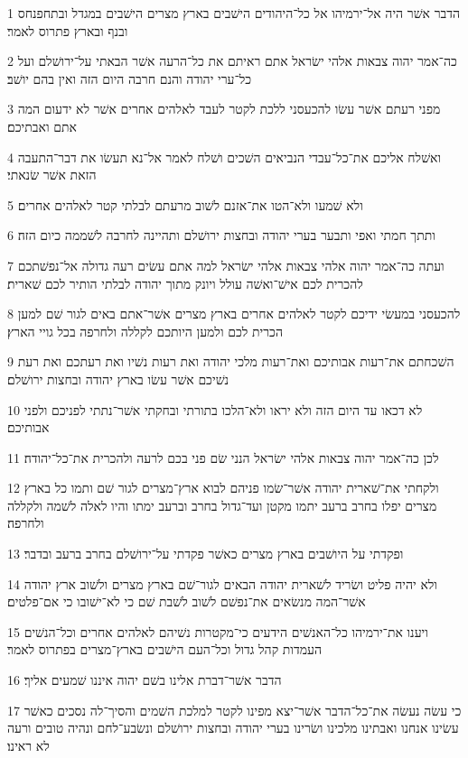 \par 1 הדבר אשׁר היה אל־ירמיהו אל כל־היהודים הישׁבים בארץ מצרים הישׁבים במגדל ובתחפנחס ובנף ובארץ פתרוס לאמר׃
\par 2 כה־אמר יהוה צבאות אלהי ישׂראל אתם ראיתם את כל־הרעה אשׁר הבאתי על־ירושׁלם ועל כל־ערי יהודה והנם חרבה היום הזה ואין בהם יושׁב׃
\par 3 מפני רעתם אשׁר עשׂו להכעסני ללכת לקטר לעבד לאלהים אחרים אשׁר לא ידעום המה אתם ואבתיכם׃
\par 4 ואשׁלח אליכם את־כל־עבדי הנביאים השׁכים ושׁלח לאמר אל־נא תעשׂו את דבר־התעבה הזאת אשׁר שׂנאתי׃
\par 5 ולא שׁמעו ולא־הטו את־אזנם לשׁוב מרעתם לבלתי קטר לאלהים אחרים׃
\par 6 ותתך חמתי ואפי ותבער בערי יהודה ובחצות ירושׁלם ותהיינה לחרבה לשׁממה כיום הזה׃
\par 7 ועתה כה־אמר יהוה אלהי צבאות אלהי ישׂראל למה אתם עשׂים רעה גדולה אל־נפשׁתכם להכרית לכם אישׁ־ואשׁה עולל ויונק מתוך יהודה לבלתי הותיר לכם שׁארית׃
\par 8 להכעסני במעשׂי ידיכם לקטר לאלהים אחרים בארץ מצרים אשׁר־אתם באים לגור שׁם למען הכרית לכם ולמען היותכם לקללה ולחרפה בכל גויי הארץ׃
\par 9 השׁכחתם את־רעות אבותיכם ואת־רעות מלכי יהודה ואת רעות נשׁיו ואת רעתכם ואת רעת נשׁיכם אשׁר עשׂו בארץ יהודה ובחצות ירושׁלם׃
\par 10 לא דכאו עד היום הזה ולא יראו ולא־הלכו בתורתי ובחקתי אשׁר־נתתי לפניכם ולפני אבותיכם׃
\par 11 לכן כה־אמר יהוה צבאות אלהי ישׂראל הנני שׂם פני בכם לרעה ולהכרית את־כל־יהודה׃
\par 12 ולקחתי את־שׁארית יהודה אשׁר־שׂמו פניהם לבוא ארץ־מצרים לגור שׁם ותמו כל בארץ מצרים יפלו בחרב ברעב יתמו מקטן ועד־גדול בחרב וברעב ימתו והיו לאלה לשׁמה ולקללה ולחרפה׃
\par 13 ופקדתי על היושׁבים בארץ מצרים כאשׁר פקדתי על־ירושׁלם בחרב ברעב ובדבר׃
\par 14 ולא יהיה פליט ושׂריד לשׁארית יהודה הבאים לגור־שׁם בארץ מצרים ולשׁוב ארץ יהודה אשׁר־המה מנשׂאים את־נפשׁם לשׁוב לשׁבת שׁם כי לא־ישׁובו כי אם־פלטים׃
\par 15 ויענו את־ירמיהו כל־האנשׁים הידעים כי־מקטרות נשׁיהם לאלהים אחרים וכל־הנשׁים העמדות קהל גדול וכל־העם הישׁבים בארץ־מצרים בפתרוס לאמר׃
\par 16 הדבר אשׁר־דברת אלינו בשׁם יהוה איננו שׁמעים אליך׃
\par 17 כי עשׂה נעשׂה את־כל־הדבר אשׁר־יצא מפינו לקטר למלכת השׁמים והסיך־לה נסכים כאשׁר עשׂינו אנחנו ואבתינו מלכינו ושׂרינו בערי יהודה ובחצות ירושׁלם ונשׂבע־לחם ונהיה טובים ורעה לא ראינו׃
